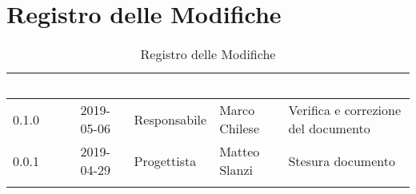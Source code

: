 \newpage

\section*{Registro delle Modifiche}

\begin{center}
\begin{longtable}[c]{|m{}|m{}|m{}|m{}|p{}|}
\hline
\rowcolor{bluelogo}\textbf{\textcolor{white}{Versione}} & \textbf{\textcolor{white}{Data}} & \textbf{\textcolor{white}{Ruolo}} & \textbf{\textcolor{white}{Autore}} & \textbf{\textcolor{white}{Descrizione}}\\
\hline \hline
\endfirsthead

\rowcolor{grigio} 0.1.0 & 2019-05-06 & Responsabile & Marco Chilese & Verifica e correzione del documento\\
\hline
0.0.1 & 2019-04-29 & Progettista & Matteo Slanzi & Stesura documento \\
\hline
\caption{Registro delle Modifiche}
\end{longtable}
\end{center}
